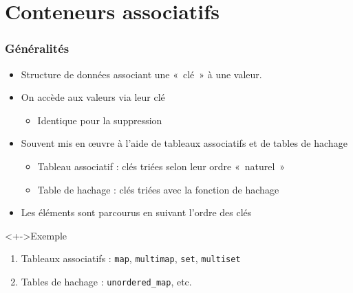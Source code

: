 \section{Conteneurs associatifs}

\begin{frame}
\frametitle{Généralités}
\begin{itemize}[<+->]
\item Structure de données associant une «~clé~» à une valeur.
\item On accède aux valeurs via leur clé
	\begin{itemize}
	\item Identique pour la suppression
	\end{itemize}
\item Souvent mis en œuvre à l'aide de tableaux associatifs et de tables de hachage
	\begin{itemize}
	\item Tableau associatif : clés triées selon leur ordre «~naturel~»
	\item Table de hachage : clés triées avec la fonction de hachage
	\end{itemize}
\item Les éléments sont parcourus en suivant l'ordre des clés
\end{itemize}
\begin{exampleblock}<+->{Exemple}
	\begin{enumerate}[<+->]
	\item Tableaux associatifs : \texttt{map}, \texttt{multimap}, \texttt{set}, \texttt{multiset}
	\item Tables de hachage : \lstinline|unordered_map|, etc.
	\end{enumerate}
\end{exampleblock}
\end{frame}

